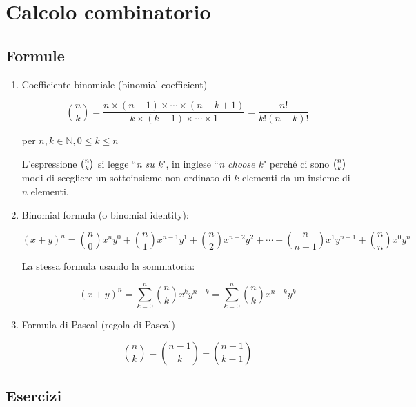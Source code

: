 \section{Calcolo combinatorio}\label{subsec:calcolo_combinatorio}

\subsection{Formule}
\setcounter{equation}{0}

\begin{enumerate}

\item 
Coefficiente binomiale (binomial coefficient)

\begin{equation}
\binom{n}{k} = \frac{
n\times (n-1)\times\cdots\times(n-k+1)
}{
k\times(k-1)\times\cdots\times1
}
=\frac{n!}{k!(n-k)!}
\end{equation}



per $n,k\in \mathbb{N} ,0\leq k\leq n$

L'espressione $\tbinom{n}{k}$ si legge ``\emph{n su k}", in inglese ``\emph{n choose k}" perché ci sono $\tbinom {n}{k}$ modi di scegliere un sottoinsieme non ordinato di $k$ elementi da un insieme di $n$ elementi. 

\item
Binomial formula (o binomial identity):

\begin{equation*}
(x+y)^n=
\binom{n}{0}x^{n}y^0+
\binom{n}{1}x^{n-1}y^1+
\binom{n}{2}x^{n-2}y^2+\cdots+
\binom{n}{n-1}x^{1}y^{n-1}+
\binom{n}{n}x^{0}y^{n}
\end{equation*}

La stessa formula usando la sommatoria:

\begin{equation}
(x+y)^n=\sum_{k=0}^{n}{\binom{n}{k}x^{k}y^{n-k}}
=\sum_{k=0}^{n}{\binom{n}{k}x^{n-k}y^{k}}
\end{equation}


\item
Formula di Pascal (regola di Pascal)

\begin{equation}\label{formula_pascal}
{n \choose k}={n-1 \choose k}+{n-1 \choose k-1}
\end{equation}

\end{enumerate}

\subsection{Esercizi}

